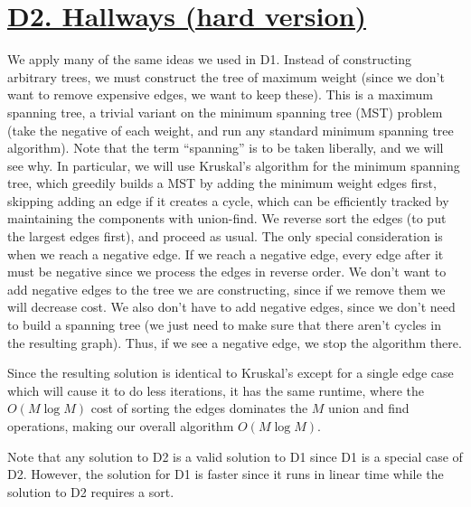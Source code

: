 \documentclass[11pt, oneside]{article}
\theoremstyle{plain}
\theoremstyle{definition}
\begin{document}
\section{\href{https://codeforces.com/group/M4wsRWBHyZ/contest/299371/problem/D2}
{D2. Hallways (hard version)}}
We apply many of the same ideas we used in D1.
Instead of constructing arbitrary trees, we must construct the tree of maximum
weight (since we don't want to remove expensive edges, we want to keep these).
This is a maximum spanning tree, a trivial variant on the minimum spanning tree
(MST) problem (take the negative of each weight, and run any 
standard minimum spanning tree algorithm).
Note that the term \enquote{spanning} is to be taken liberally, and we will see
why. In particular, we will use Kruskal's algorithm for the minimum spanning
tree, which greedily builds a MST by adding the minimum weight edges first,
skipping adding an edge if it creates a cycle, which can be efficiently tracked
by maintaining the components with union-find. We reverse sort the edges
(to put the largest edges first), and proceed as usual.
The only special consideration is when we reach a negative edge.
If we reach a negative edge, every edge after it must be negative since we 
process the edges in reverse order. We don't want to add negative edges to the
tree we are constructing, since if we remove them we will decrease cost.
We also don't have to add negative edges, since we don't need to build a
spanning tree (we just need to make sure that there aren't cycles in the
resulting graph). Thus, if we see a negative edge, we stop the algorithm there.

Since the resulting solution is identical to Kruskal's except for a single edge
case which will cause it to do less iterations, it has the same runtime,
where the \( O(M \log M) \) cost of sorting the edges dominates the \( M \)
union and find operations, making our overall algorithm \( O(M \log M) \).

Note that any solution to D2 is a valid solution to D1
since D1 is a special case of D2. However, the solution for D1 is faster since
it runs in linear time while the solution to D2 requires a sort.

\end{document}
